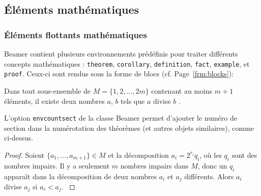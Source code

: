 \documentclass[10pt,    %
    french,             %
    xcolor=table,       %
    envcountsect        %
]{beamer}
\begin{document}
\subsection{Éléments mathématiques}
\begin{frame}
    \frametitle{Éléments flottants mathématiques}
    \small
    
    Beamer contient plusieurs environnements prédéfinis pour traiter différents concepts mathématiques : \texttt{theorem}, \texttt{corollary}, \texttt{definition}, \texttt{fact}, \texttt{example}, et \texttt{proof}. Ceux-ci sont rendus sous la forme de blocs (cf. Page~\ref{frm:blocks}):
    
    \begin{theorem}
        Dans tout sous-ensemble de $M = \{1, 2, ... , 2m\}$ contenant au moins $m + 1$ éléments, il existe deux nombres $a$, $b$ tels que $a$ divise $b$ \cite{Neunhauserer2013}.
        \label{th:theorem}
    \end{theorem} 
    
    L'option \texttt{envcountsect} de la classe Beamer permet d'ajouter le numéro de section dans la numérotation des théorèmes (et autres objets similaires), comme ci-dessus.
    
    \begin{proof}
         Soient $\{a_1, . . . , a_{m+1}\} \in M$ et la décomposition $a_i = 2^{r_i} q_i$, où les $q_i$ sont des nombres impairs. Il y a seulement $m$ nombres impairs dans $M$, donc un $q_i$ apparaît dans la décomposition de deux nombres $a_i$ et $a_j$ différents. Alors $a_i$ divise $a_j$ si $a_i < a_j$.
        \label{th:proof}
    \end{proof} 
\end{frame}
    




\end{document}
